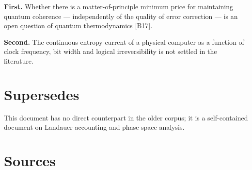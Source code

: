 \textbf{First.} Whether there is a matter-of-principle minimum price for
maintaining quantum coherence --- independently of the quality of error correction
--- is an open question of quantum thermodynamics [B17].

\textbf{Second.} The continuous entropy current of a physical computer as a
function of clock frequency, bit width and logical irreversibility is not settled
in the literature.

\section{Supersedes}

This document has no direct counterpart in the older corpus; it is a
self-contained document on Landauer accounting and phase-space analysis.

\clearpage
{}
{}
\section*{Sources}


